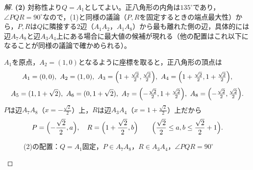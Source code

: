 \documentclass[../main.tex]{subfiles}
\begin{document}
\begin{proof}[解]
  \textbf{(2)} 対称性より$Q=A_1$としてよい。正八角形の内角は$135^\circ$であり，$\angle PQR=90^\circ$なので，(1)と同様の議論（$P,R$を固定するときの端点最大性）から，$P,R$は$Q$に隣接する2辺（$A_1A_2$，$A_1A_8$）から最も離れた側の辺，具体的には辺$A_7A_8$と辺$A_3A_4$上にある場合に最大値の候補が現れる（他の配置はこれ以下になることが同様の議論で確かめられる）。

  $A_1$を原点，$A_2=(1,0)$となるように座標を取ると，正八角形の頂点は
  \begin{align*}
    A_1=(0,0),\ A_2=(1,0),\ A_3=\Bigl(1+\tfrac{\sqrt2}2,\tfrac{\sqrt2}2\Bigr),\ A_4=\Bigl(1+\tfrac{\sqrt2}2,1+\tfrac{\sqrt2}2\Bigr),
  \end{align*}
  \begin{align*}
    A_5=(1,1+\sqrt2),\ A_6=(0,1+\sqrt2),\ A_7=\Bigl(-\tfrac{\sqrt2}2,1+\tfrac{\sqrt2}2\Bigr),\ A_8=\Bigl(-\tfrac{\sqrt2}2,\tfrac{\sqrt2}2\Bigr).
  \end{align*}
  $P$は辺$A_7A_8$（$x=-\frac{\sqrt2}2$）上，$R$は辺$A_3A_4$（$x=1+\frac{\sqrt2}2$）上だから
  \begin{align*}
    P=\Bigl(-\frac{\sqrt2}2,a\Bigr),\quad R=\Bigl(1+\frac{\sqrt2}2,b\Bigr)\qquad\Bigl(\frac{\sqrt2}2\le a,b\le\frac{\sqrt2}2+1\Bigr).
  \end{align*}

  \begin{figure}[htb]
    \centering
    \caption{(2)の配置：$Q=A_1$固定，$P\in A_7A_8$，$R\in A_3A_4$，$\angle PQR=90^\circ$}
  \end{figure}


\end{proof}
\end{document}
